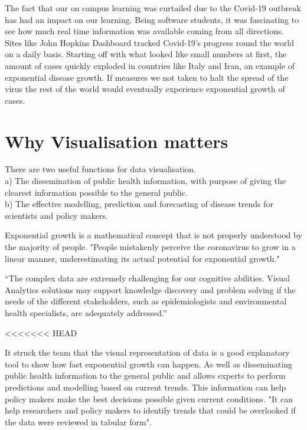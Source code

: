 \vspace{1mm}

The fact that our on campus learning was curtailed due to the Covid-19 outbreak has had an impact on our learning. Being software students, it was fascinating to see how much real time information was available coming from all directions. Sites like John Hopkins Dashboard tracked Covid-19's progress round the world on a daily basis. Starting off with what looked like small numbers at first, the amount of cases quickly exploded in countries like Italy and Iran, an example of exponential disease growth. If measures we not taken to halt the spread of the virus the rest of the world would eventually experience exponential growth of cases.\\

\vspace{1mm}
\section{Why Visualisation matters}

There are two useful functions for data visualisation.\\
a) The dissemination of public health information, with purpose of giving the clearest information possible to the general public.\\
b) The effective modelling, prediction and forecasting of disease trends for scientists and policy makers.

\vspace{5mm}

Exponential growth is a mathematical concept that is not properly understood by the majority of people.
"People mistakenly perceive the coronavirus to grow in a linear manner, underestimating its actual potential for exponential growth."\cite{lammers2020correcting}\\

\vspace{2mm}

“The complex data are extremely challenging for our cognitive abilities. Visual Analytics solutions may support knowledge discovery and problem solving if the needs of the different stakeholders, such as epidemiologists and environmental health specialists, are adequately addressed.”\cite{preim2020survey}

\vspace{5mm}
<<<<<<< HEAD


It struck the team that the visual representation of data is a good explanatory tool to show how fast exponential growth can happen. As well as disseminating public health information to the general public and allows experts to perform predictions and modelling based on current trends. This information can help policy makers make the best decisions possible given current conditions. "It can help researchers and policy makers to identify trends that could be overlooked if the data were reviewed in tabular form". \cite{tebe2020covid19}


